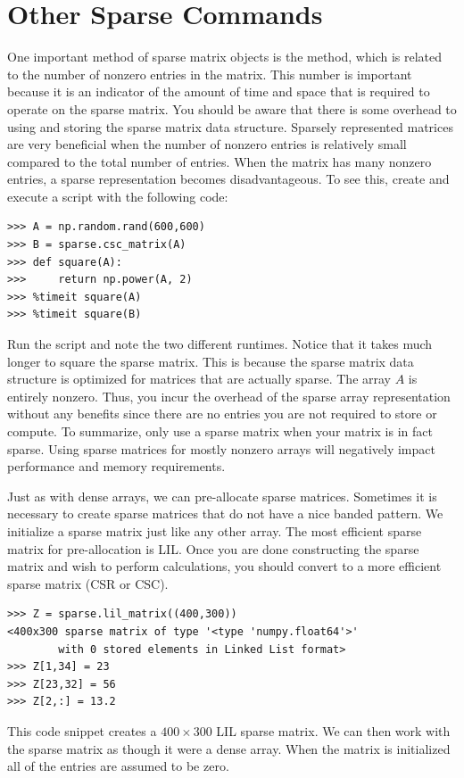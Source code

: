\section*{Other Sparse Commands}
One important method of sparse matrix objects is the  method,
which is related to the number of nonzero entries in the matrix.
This number is important because it is an indicator of the amount of time and space
that is required to operate on the sparse matrix.
You should be aware that there is some overhead to using and storing the sparse matrix data structure.
Sparsely represented matrices are very beneficial when the number of
nonzero entries is relatively small compared to the total number of entries.
When the matrix has many nonzero entries, a sparse representation becomes disadvantageous.
To see this, create and execute a script with the following code:
\begin{lstlisting}
>>> A = np.random.rand(600,600)
>>> B = sparse.csc_matrix(A)
>>> def square(A):
>>>     return np.power(A, 2)
>>> %timeit square(A)
>>> %timeit square(B)
\end{lstlisting}
Run the script and note the two different runtimes.
Notice that it takes much longer to square the sparse matrix.
This is because the sparse matrix data structure is optimized for matrices that are actually sparse.
The array $A$ is entirely nonzero.
Thus, you incur the overhead of the sparse array representation without any
benefits since there are no entries you are not required to store or compute.
To summarize, only use a sparse matrix when your matrix is in fact sparse.
Using sparse matrices for mostly nonzero arrays will negatively impact performance and memory requirements.

Just as with dense arrays, we can pre-allocate sparse matrices.
Sometimes it is necessary to create sparse matrices that do not have a nice banded pattern.
We initialize a sparse matrix just like any other array.
The most efficient sparse matrix for pre-allocation is LIL.
Once you are done constructing the sparse matrix and wish to perform calculations,
you should convert to a more efficient sparse matrix (CSR or CSC).
\begin{lstlisting}
>>> Z = sparse.lil_matrix((400,300))
<400x300 sparse matrix of type '<type 'numpy.float64'>'
        with 0 stored elements in Linked List format>
>>> Z[1,34] = 23
>>> Z[23,32] = 56
>>> Z[2,:] = 13.2
\end{lstlisting}
This code snippet creates a $400 \times 300$ LIL sparse matrix.
We can then work with the sparse matrix as though it were a dense array.
When the matrix is initialized all of the entries are assumed to be zero. 
